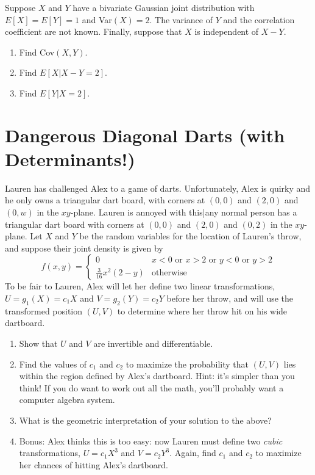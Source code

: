 \documentclass{article}
\begin{document}
Suppose $X$ and $Y$ have a bivariate Gaussian joint distribution with $E[X] = E[Y] = 1$ and Var$(X) = 2$. The variance of $Y$ and the correlation coefficient are not known. Finally, suppose that $X$ is independent of $X - Y$.

\begin{enumerate}[label=(\alph*)]
\itemsep0em
    \item Find Cov$(X, Y)$.\vfill
    \item Find $E[X \vert X - Y = 2]$.\vfill
    \item Find $E[Y \vert X = 2]$.\vfill
\end{enumerate}

\newpage

\section{Dangerous Diagonal Darts (with Determinants!)}
Lauren has challenged Alex to a game of darts. Unfortunately, Alex is quirky and he only
owns a triangular dart board, with corners at $(0,0)$ and $(2,0)$ and $(0,w)$ in the $xy$-plane.
Lauren is annoyed with this|any normal person has a triangular dart board with corners at $(0,0)$
and $(2,0)$ and $(0,2)$ in the $xy$-plane. Let $X$ and $Y$ be the random variables for the location
of Lauren's throw, and suppose their joint density is given by
\[
    f(x,y ) = \begin{cases}
        0 & x < 0 \text{ or } x > 2 \text{ or } y < 0 \text{ or } y > 2 \\
        \frac{3}{16}x^2(2-y) & \text{otherwise}
    \end{cases}
\]
To be fair to Lauren, Alex will let her define two linear transformations, $U = g_1(X) = c_1X$
and $V = g_2(Y) = c_2Y$ before her throw, and will use the transformed position $(U,V)$
to determine where her throw hit on his wide dartboard.
\begin{enumerate}[label=(\alph*)]
\itemsep0em
    \item Show that $U$ and $V$ are invertible and differentiable.\vfill
    \item Find the values of $c_1$ and $c_2$ to maximize the probability that $(U,V)$
        lies within the region defined by Alex's dartboard. Hint: it's simpler than you think!
        If you do want to work out all the math, you'll probably want a computer algebra system. \vfill
    \item What is the geometric interpretation of your solution to the above? \vfill
    \item Bonus: Alex thinks this is too easy: now Lauren must define two \textit{cubic}
        transformations, $U = c_1 X^3$ and $V = c_2 Y^3$. Again, find $c_1$ and $c_2$
        to maximize her chances of hitting Alex's dartboard. \vfill
\end{enumerate}
\end{document}
